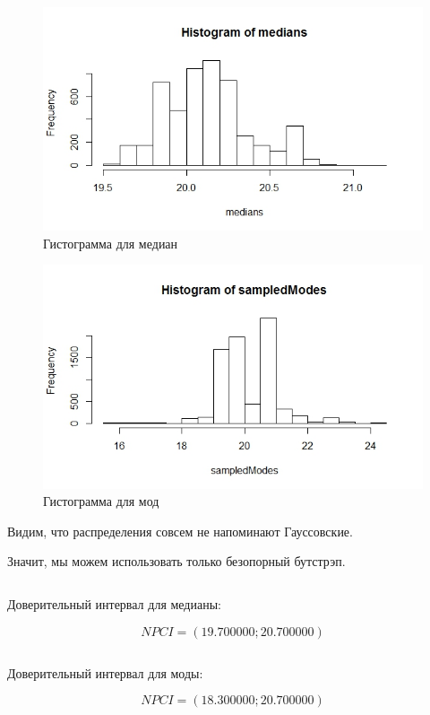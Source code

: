 \documentclass{article}
\begin{document}
\begin{figure}[H] 
\centering
\includegraphics[scale=0.6]{img/2_medians.jpeg}
\caption{Гистограмма для медиан}
\label{fig :metka1}
\end{figure}


\begin{figure}[H] 
\centering
\includegraphics[scale=0.6]{img/2_modes.jpeg}
\caption{Гистограмма для мод}
\label{fig :metka1}
\end{figure}

Видим, что распределения совсем не напоминают Гауссовские. 

Значит, мы можем использовать только безопорный бутстрэп.

$$$$

Доверительный интервал для медианы:

$$NPCI = (19.700000; 20.700000)$$

$$$$

Доверительный интервал для моды:

$$NPCI = (18.300000; 20.700000)$$
\end{document}
